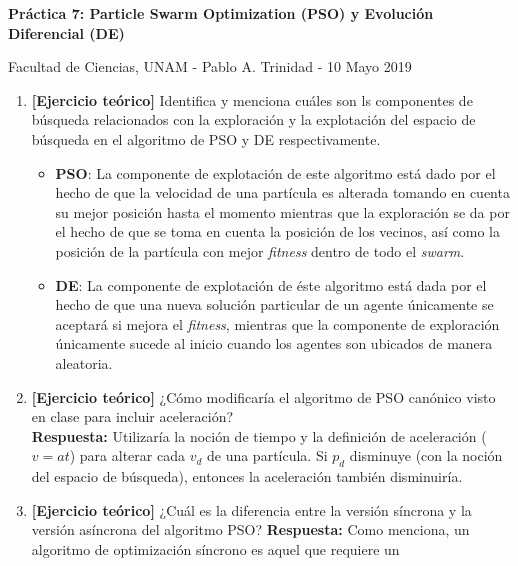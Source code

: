 \documentclass[10pt, letterpaper]{article}
\theoremstyle{definition}
\begin{document}
\begin{center}
    {\large \bfseries Práctica 7: Particle Swarm Optimization (PSO) y Evolución Diferencial (DE) \par}
    \vspace{0.2cm}
    Facultad de Ciencias, UNAM - Pablo A. Trinidad - 10 Mayo 2019
\end{center}

\begin{enumerate}
    \item \textbf{[Ejercicio teórico]} Identifica y menciona cuáles son ls
    componentes de búsqueda relacionados con la exploración y la explotación
    del espacio de búsqueda en el algoritmo de PSO y DE respectivamente.
        \begin{itemize}
            \item \textbf{PSO}: La componente de explotación de este algoritmo
                  está dado por el hecho de que la velocidad de una partícula
                  es alterada tomando en cuenta su mejor posición hasta el momento
                  mientras que la exploración se da por el hecho de que se toma
                  en cuenta la posición de los vecinos, así como la posición de
                  la partícula con mejor \textit{fitness} dentro de todo
                  el \textit{swarm}.
            \item \textbf{DE}: La componente de explotación de éste algoritmo
                  está dada por el hecho de que una nueva solución particular
                  de un agente únicamente se aceptará si mejora el \textit{fitness},
                  mientras que la componente de exploración únicamente sucede
                  al inicio cuando los agentes son ubicados de manera aleatoria.
        \end{itemize}
    \item \textbf{[Ejercicio teórico]} ¿Cómo modificaría el algoritmo de PSO
    canónico visto en clase para incluir aceleración?\\
        \textbf{Respuesta:} Utilizaría la noción de tiempo y la definición
        de aceleración ($v=at$) para alterar cada $v_d$ de una partícula. Si
        $p_d$ disminuye (con la noción del espacio de búsqueda), entonces la
        aceleración también disminuiría.
    \item \textbf{[Ejercicio teórico]} ¿Cuál es la diferencia entre la versión
    síncrona y la versión asíncrona del algoritmo PSO?
        \textbf{Respuesta:} Como \cite{pso-sync-vs-async} menciona, un algoritmo
        de optimización síncrono es aquel que requiere un

\end{enumerate}
\end{document}
